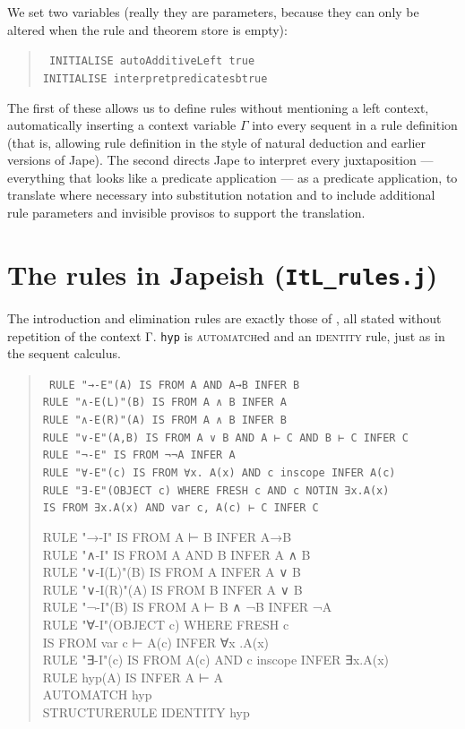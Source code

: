 We set two variables (really they are parameters, because they can only be altered when the rule and theorem store is empty):
\begin{quote}\tt\small
INITIALISE autoAdditiveLeft true \\
INITIALISE interpretpredicatesbtrue
\end{quote}

The first of these allows us to define rules without mentioning a left context, automatically inserting a context variable \ensuremath{\Gamma} into every sequent in a rule definition (that is, allowing rule definition in the style of natural deduction and earlier versions of Jape). The second directs Jape to interpret every juxtaposition --- everything that looks like a predicate application --- as a predicate application, to translate where necessary into substitution notation and to include additional rule parameters and invisible provisos to support the translation.

\section{The rules in Japeish (\texttt{ItL\_rules.j})}

The introduction and elimination rules are exactly those of , all stated without repetition of the context Γ. \texttt{hyp} is \textsc{automatch}ed and an \textsc{identity} rule, just as in the sequent calculus.
\begin{quote}\tt\small
RULE "→-E"(A)      IS FROM A AND A→B INFER B \\
RULE "∧-E(L)"(B)   IS FROM A ∧ B INFER A \\
RULE "∧-E(R)"(A)   IS FROM A ∧ B INFER B \\
RULE "∨-E"(A,B)    IS FROM A ∨ B AND A ⊢ C AND B ⊢ C INFER C \\
RULE "¬-E"         IS FROM ¬¬A INFER A \\
RULE "∀-E"(c)      IS FROM ∀x. A(x) AND c inscope INFER A(c) \\
RULE "∃-E"(OBJECT c) WHERE FRESH c AND c NOTIN ∃x.A(x) \\
\tab IS FROM ∃x.A(x) AND var c, A(c) ⊢ C INFER C

RULE "→-I"         IS FROM A ⊢ B INFER A→B \\
RULE "∧-I"         IS FROM A AND B INFER A ∧ B \\
RULE "∨-I(L)"(B)   IS FROM A INFER A ∨ B \\
RULE "∨-I(R)"(A)   IS FROM B INFER A ∨ B \\
RULE "¬-I"(B)      IS FROM A ⊢ B ∧ ¬B INFER ¬A \\
RULE "∀-I"(OBJECT c) WHERE FRESH c \\
\tab IS FROM var c ⊢ A(c) INFER ∀x .A(x) \\
RULE "∃-I"(c)      IS FROM A(c) AND c inscope INFER ∃x.A(x) \\

RULE hyp(A) IS INFER A ⊢ A \\
AUTOMATCH hyp \\
STRUCTURERULE IDENTITY   hyp
\end{quote}

